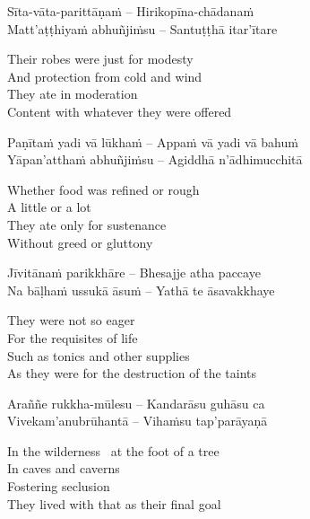 \begin{verses}
  Sīta-vāta-parittāṇaṁ – Hirikopīna-chādanaṁ\\
  Matt'aṭṭhiyaṁ abhuñjiṁsu – Santuṭṭhā itar'ītare
\end{verses}

\begin{english-verses}
  Their robes were just for modesty\\
  And protection from cold and wind\\
  They ate in moderation\\
  Content with whatever they were offered
\end{english-verses}

\begin{verses}
  Paṇītaṁ yadi vā lūkhaṁ – Appaṁ vā yadi vā bahuṁ\\
  Yāpan'atthaṁ abhuñjiṁsu – Agiddhā n'ādhimucchitā
\end{verses}

\begin{english-verses}
  Whether food was refined or rough\\
  A little or a lot\\
  They ate only for sustenance\\
  Without greed or gluttony
\end{english-verses}

\begin{verses}
  Jīvitānaṁ parikkhāre – Bhesajje atha paccaye\\
  Na bāḷhaṁ ussukā āsuṁ – Yathā te āsavakkhaye
\end{verses}

\begin{english-verses}
  They were not so eager\\
  For the requisites of life\\
  Such as tonics and other supplies\\
  As they were for the destruction of the taints
\end{english-verses}

\begin{verses}
  Araññe rukkha-mūlesu – Kandarāsu guhāsu ca\\
  Vivekam'anubrūhantā – Vihaṁsu tap'parāyaṇā
\end{verses}

\begin{english-verses}
  In the wilderness \breathmark\ at the foot of a tree\\
  In caves and caverns\\
  Fostering seclusion\\
  They lived with that as their final goal
\end{english-verses}

